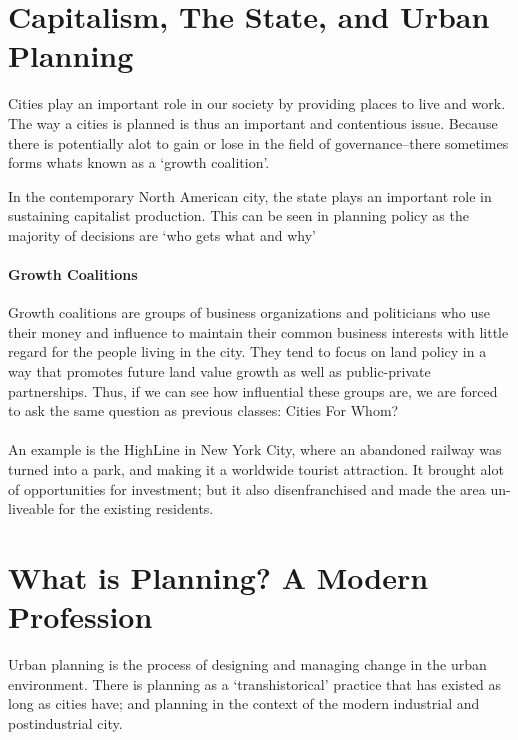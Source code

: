 \documentclass[12pt]{book}
\title{\coursetitle\linebreak\lecturename}
\author{\\Cain Susko\\ 
           \\ \\ \\
      Queen's University 
    \\School of Computing\\}
\begin{document}
\begin{titlepage}
        \maketitle
\end{titlepage}


\section*{Capitalism, The State, and Urban Planning}
Cities play an important role in our society by providing places to live and work.
The way a cities is planned is thus an important and contentious issue.
Because there is potentially alot to gain or lose in the field of governance--there
sometimes forms whats known as a `growth coalition'.

In the contemporary North American city, the state plays an important role in 
sustaining capitalist production. 
This can be seen in planning policy as the majority of decisions are `who gets what 
and why'

\paragraph{Growth Coalitions}
Growth coalitions are groups of business organizations and politicians who use their
money and influence to maintain their common business interests with little 
regard for the people living in the city. They tend to focus on land policy
in a way that promotes future land value growth as well as public-private partnerships.
Thus, if we can see how influential these groups are, we are forced to ask the same
question as previous classes: Cities For Whom?

\paragraph{}
An example is the HighLine in New York City, where an abandoned railway was turned 
into a park, and making it a worldwide tourist attraction. It brought alot of 
opportunities for investment; but it also disenfranchised and made the area 
un-liveable for the existing residents.

\section*{What is Planning? A Modern Profession}
Urban planning is the process of designing and managing change in the urban
environment. There is planning as a `transhistorical' practice that has existed 
as long as cities have; and planning in the context of the modern industrial 
and postindustrial city. 
\end{document}
